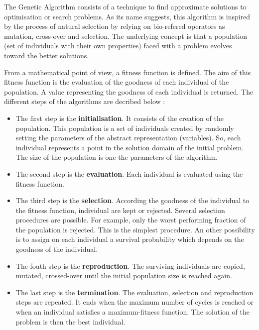 \documentclass[main.tex]{subfiles}
\begin{document}
\bigskip


\NI The Genetic Algorithm consists of a technique to find approximate solutions to optimisation or search problems. As its name suggests, this algorithm is inspired by the process of natural selection by relying on bio-refered operators as mutation, cross-over and selection. The underlying concept is that a population (set of individuals with their own properties) 
faced with a problem evolves toward the better solutions.


\bigskip


\NI From a mathematical point of view, a fitness function is defined. The aim of this fitness function is the evaluation of the goodness of each individual of the population. A value representing the goodness of each individual is returned. The different steps of the algorithms are decribed below : 


\begin{itemize}
\item The first step is the \textbf{initialisation}. It consists of the creation of the population. This population is a set of individuals created by randomly setting the parameters of the abstract representation (variables). So, each individual represents a point in the solution domain of the initial problem. The size of the population is one the parameters of the algorithm. 

\item The second step is the \textbf{evaluation}. Each individual is evaluated using the fitness function.

\item The third step is the \textbf{selection}. According the goodness of the individual to the fitness function, individual are kept or rejected. Several selection procedures are possible. For example, only the worst performing fraction of the population is rejected. This is the simplest procedure. An other possibility is to assign on each individual a survival probability which depends on the goodness of the individual.

\item The fouth step is the \textbf{reproduction}. The surviving individuals are copied, mutated, crossed-over until the initial population size is reached again.

\item The last step is the \textbf{termination}. The evaluation, selection and reproduction steps are repeated. It ends when the maximum number of cycles is reached or when an individual satisfies a maximum-fitness function. The solution of the problem is then the best individual. 

\end{itemize}  
\end{document}

